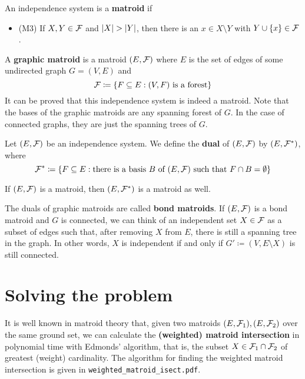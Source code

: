 \documentclass[english,12pt]{article}
\begin{document}
        \begin{definition}
            An independence system is a \textbf{matroid} if
            \begin{itemize}
                \item[] (M3) If $X, Y \in \mathcal{F}$ and $\left|X\right| > \left|Y\right|$, then there is an $x \in X \setminus Y$ with $Y \cup \{x\} \in \mathcal{F}$.
            \end{itemize}
        \end{definition}

        \begin{definition}
            A \textbf{graphic matroid} is a matroid $(E, \mathcal{F})$ where $E$ is the set of edges of some undirected graph $G = (V, E)$ and
            \[\mathcal{F} \coloneqq \{F \subseteq E : (V, F) \text{ is a forest}\}\]
            It can be proved that this independence system is indeed a matroid.
            Note that the bases of the graphic matroids are any spanning forest of $G$.
            In the case of connected graphs, they are just the spanning trees of $G$.
        \end{definition}

        \begin{definition}
            Let $(E, \mathcal{F})$ be an independence system. We define the \textbf{dual} of $(E, \mathcal{F})$ by $(E, \mathcal{F}^*)$, where
            \[\mathcal{F}^* \coloneqq \{F \subseteq E : \text{there is a basis } B \text { of } (E, \mathcal{F}) \text{ such that } F \cap B = \emptyset\}\]
        \end{definition}

        \begin{proposition}
            If $(E, \mathcal{F})$ is a matroid, then $(E, \mathcal{F}^*)$ is a matroid as well.
        \end{proposition}
        
        The duals of graphic matroids are called \textbf{bond matroids}.
        If $(E, \mathcal{F})$ is a bond matroid and $G$ is connected, we can think of an independent set $X \in \mathcal{F}$ as a subset of edges such that, after removing $X$ from $E$, there is still a spanning tree in the graph.
        In other words, $X$ is independent if and only if $G' \coloneqq (V, E \setminus X)$ is still connected.

    \section{Solving the problem}
        
        It is well known in matroid theory that, given two matroids $(E, \mathcal{F}_1), (E, \mathcal{F}_2)$ over the same ground set, we can calculate the \textbf{(weighted) matroid intersection} in polynomial time with Edmonds' algorithm, that is, the subset $X \in \mathcal{F}_1 \cap \mathcal{F}_2$ of greatest (weight) cardinality.
        The algorithm for finding the weighted matroid intersection is given in \verb*|weighted_matroid_isect.pdf|.
\end{document}
